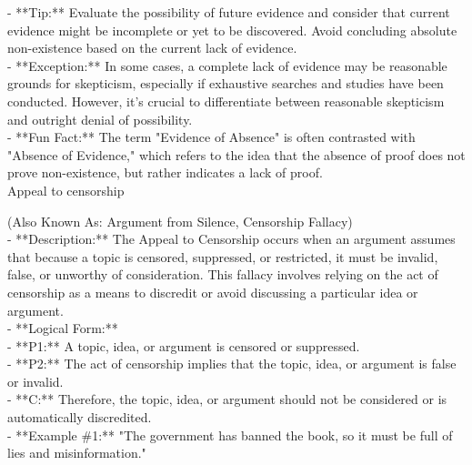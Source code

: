 \documentclass[a4paper,12pt,single,pdftex]{scrartcl}
\begin{document}
    
      - **Tip:** Evaluate the possibility of future evidence and consider that current evidence might be incomplete or yet to be discovered. Avoid concluding absolute non-existence based on the current lack of evidence.
    \\

    
      - **Exception:** In some cases, a complete lack of evidence may be reasonable grounds for skepticism, especially if exhaustive searches and studies have been conducted. However, it’s crucial to differentiate between reasonable skepticism and outright denial of possibility.
    \\

    
      - **Fun Fact:** The term "Evidence of Absence" is often contrasted with "Absence of Evidence," which refers to the idea that the absence of proof does not prove non-existence, but rather indicates a lack of proof.
    \\

  

Appeal to censorship
    
      (Also Known As: Argument from Silence, Censorship Fallacy)
    \\

  
    
      - **Description:** The Appeal to Censorship occurs when an argument assumes that because a topic is censored, suppressed, or restricted, it must be invalid, false, or unworthy of consideration. This fallacy involves relying on the act of censorship as a means to discredit or avoid discussing a particular idea or argument.
    \\

    
      - **Logical Form:**
    \\

    
        - **P1:** A topic, idea, or argument is censored or suppressed.
    \\

    
        - **P2:** The act of censorship implies that the topic, idea, or argument is false or invalid.
    \\

    
        - **C:** Therefore, the topic, idea, or argument should not be considered or is automatically discredited.
    \\

    
      - **Example \#1:** "The government has banned the book, so it must be full of lies and misinformation."
    \\
\end{document}
